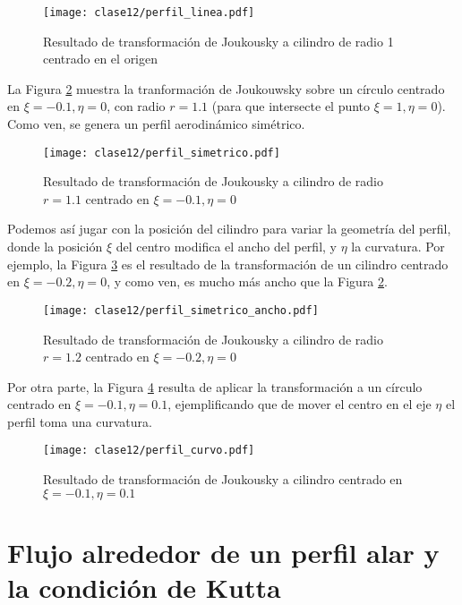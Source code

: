 \begin{figure}[h!]
\centering
\texttt{[image: clase12/perfil\_linea.pdf]}
\caption{Resultado de transformación de Joukousky a cilindro de radio 1 centrado en el origen}\label{fig:perfil_linea}
\end{figure}


La Figura \ref{fig:perfil_simetrico} muestra la tranformación de Joukouwsky sobre un círculo centrado en $\xi=-0.1, \eta=0$, con radio $r=1.1$ (para que intersecte el punto $\xi=1, \eta=0$).
Como ven, se genera un perfil aerodinámico simétrico.
%
\begin{figure}[h!]
\centering
\texttt{[image: clase12/perfil\_simetrico.pdf]}
\caption{Resultado de transformación de Joukousky a cilindro de radio $r=1.1$ centrado en $\xi=-0.1, \eta=0$}\label{fig:perfil_simetrico}
\end{figure}
%
Podemos así jugar con la posición del cilindro para variar la geometría del perfil, donde la posición $\xi$ del centro modifica el ancho del perfil, y $\eta$ la curvatura.
Por ejemplo, la Figura \ref{fig:perfil_simetrico_ancho} es el resultado de la transformación de un cilindro centrado en $\xi=-0.2, \eta=0$, y como ven, es mucho más ancho que la Figura \ref{fig:perfil_simetrico}.
%
\begin{figure}[h!]
\centering
\texttt{[image: clase12/perfil\_simetrico\_ancho.pdf]}
\caption{Resultado de transformación de Joukousky a cilindro de radio $r=1.2$ centrado en $\xi=-0.2, \eta=0$}\label{fig:perfil_simetrico_ancho}
\end{figure}

Por otra parte, la Figura \ref{fig:perfil_curvo} resulta de aplicar la transformación a un círculo centrado en $\xi=-0.1, \eta=0.1$, ejemplificando que de mover el centro en el eje $\eta$ el perfil toma una curvatura.
%
\begin{figure}[h!]
\centering
\texttt{[image: clase12/perfil\_curvo.pdf]}
\caption{Resultado de transformación de Joukousky a cilindro centrado en $\xi=-0.1, \eta=0.1$}\label{fig:perfil_curvo}
\end{figure}

\section*{Flujo alrededor de un perfil alar y la condición de Kutta}

